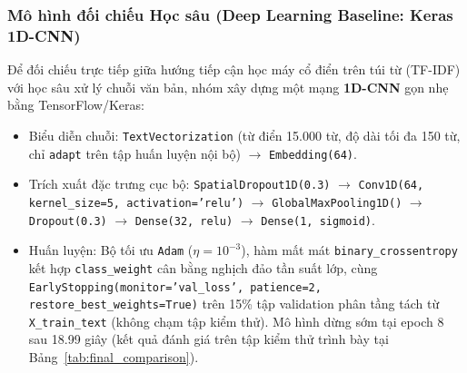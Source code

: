 \subsubsection{Mô hình đối chiếu Học sâu (Deep Learning Baseline: Keras 1D-CNN)}\label{sec:dl_cnn}
Để đối chiếu trực tiếp giữa hướng tiếp cận học máy cổ điển trên túi từ (TF-IDF) với học sâu xử lý chuỗi văn bản, nhóm xây dựng một mạng \textbf{1D-CNN} gọn nhẹ bằng TensorFlow/Keras:
\begin{itemize}
    \item Biểu diễn chuỗi: \texttt{TextVectorization} (từ điển 15.000 từ, độ dài tối đa 150 từ, chỉ \texttt{adapt} trên tập huấn luyện nội bộ) $\rightarrow$ \texttt{Embedding(64)}.
    \item Trích xuất đặc trưng cục bộ: \texttt{SpatialDropout1D(0.3)} $\rightarrow$ \texttt{Conv1D(64, kernel\_size=5, activation='relu')} $\rightarrow$ \texttt{GlobalMaxPooling1D()} $\rightarrow$ \texttt{Dropout(0.3)} $\rightarrow$ \texttt{Dense(32, relu)} $\rightarrow$ \texttt{Dense(1, sigmoid)}.
    \item Huấn luyện: Bộ tối ưu \texttt{Adam} ($\eta = 10^{-3}$), hàm mất mát \texttt{binary\_crossentropy} kết hợp \texttt{class\_weight} cân bằng nghịch đảo tần suất lớp, cùng \texttt{EarlyStopping(\allowbreak monitor='val\_loss', patience=2, restore\_best\_weights=True)} trên 15\% tập validation phân tầng tách từ \texttt{X\_train\_text} (không chạm tập kiểm thử). Mô hình dừng sớm tại epoch 8 sau 18.99 giây (kết quả đánh giá trên tập kiểm thử trình bày tại Bảng~\ref{tab:final_comparison}).
\end{itemize}
